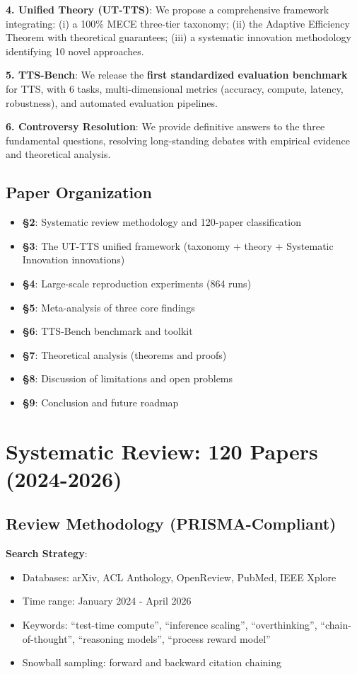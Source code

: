 \documentclass[10pt,preprint]{neurips_2024}
\begin{document}
\textbf{4. Unified Theory (UT-TTS)}: We propose a comprehensive framework integrating: (i) a 100\% MECE three-tier taxonomy; (ii) the Adaptive Efficiency Theorem with theoretical guarantees; (iii) a systematic innovation methodology identifying 10 novel approaches.

\textbf{5. TTS-Bench}: We release the \textbf{first standardized evaluation benchmark} for TTS, with 6 tasks, multi-dimensional metrics (accuracy, compute, latency, robustness), and automated evaluation pipelines.

\textbf{6. Controversy Resolution}: We provide definitive answers to the three fundamental questions, resolving long-standing debates with empirical evidence and theoretical analysis.

\subsection{Paper Organization}

\begin{itemize}
    \item \textbf{\S2}: Systematic review methodology and 120-paper classification
    \item \textbf{\S3}: The UT-TTS unified framework (taxonomy + theory + Systematic Innovation innovations)
    \item \textbf{\S4}: Large-scale reproduction experiments (864 runs)
    \item \textbf{\S5}: Meta-analysis of three core findings
    \item \textbf{\S6}: TTS-Bench benchmark and toolkit
    \item \textbf{\S7}: Theoretical analysis (theorems and proofs)
    \item \textbf{\S8}: Discussion of limitations and open problems
    \item \textbf{\S9}: Conclusion and future roadmap
\end{itemize}

\section{Systematic Review: 120 Papers (2024-2026)}

\subsection{Review Methodology (PRISMA-Compliant)}

\textbf{Search Strategy}:
\begin{itemize}
    \item Databases: arXiv, ACL Anthology, OpenReview, PubMed, IEEE Xplore
    \item Time range: January 2024 - April 2026
    \item Keywords: ``test-time compute'', ``inference scaling'', ``overthinking'', ``chain-of-thought'', ``reasoning models'', ``process reward model''
    \item Snowball sampling: forward and backward citation chaining
\end{itemize}
\end{document}
